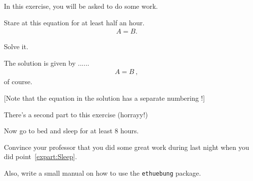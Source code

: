 \documentclass[11pt,a4paper]{article}
\begin{document}
\MakeUebungHeader


In this exercise, you will be asked to do some work.


\begin{exenumerate}
\item Stare at this equation for at least half an hour.
  \begin{align}
    A = B.
  \end{align}

\item Solve it.

  \begin{loesung}
    The solution is given by ...... 
    \begin{align}
      A=B\ ,
    \end{align}
    of course.

    [Note that the equation in the solution has a separate numbering !]
  \end{loesung}
\end{exenumerate}

There's a second part to this exercise (horrayy!)

\begin{exenumerate} %
\item \label{expart:Sleep} Now go to bed and sleep for at least 8 hours.
\item Convince your professor that you did some great work during last night when you did
  point~\ref{expart:Sleep}.
\end{exenumerate}


\begin{exenumerate}
\item Also, write a small manual on how to use the \texttt{ethuebung} package.
\end{exenumerate}

\end{document}

